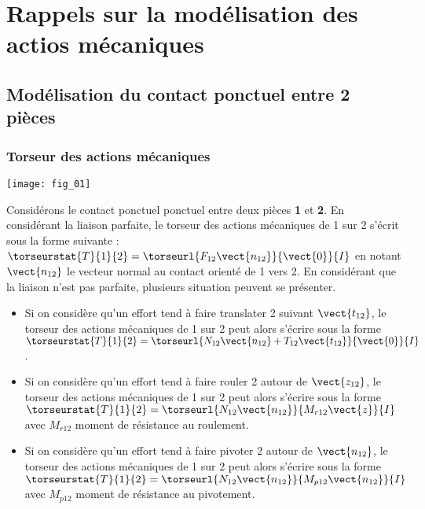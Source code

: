 \setchapterpreamble[u]{\margintoc}

\chapter{Rappels sur la modélisation des actios mécaniques}






\section{Modélisation du contact ponctuel entre 2 pièces}
\subsection{Torseur des actions mécaniques}
\begin{marginfigure}[3cm]
\begin{center}
\texttt{[image: fig\_01]}
\end{center}
\end{marginfigure}
Considérons le contact ponctuel ponctuel entre deux pièces \textbf{1} et \textbf{2}. En considérant la liaison parfaite, le torseur des actions mécaniques de 1 sur 2 s'écrit sous la forme suivante : $\torseurstat{T}{1}{2}=\torseurl{F_{12} \vect{n_{12}}}{\vect{0}}{I}$ en notant $\vect{n_{12}}$ le vecteur normal au contact orienté de 1 vers 2. 
En considérant que la liaison n'est pas parfaite, plusieurs situation peuvent se présenter.  


\begin{itemize}
\item Si on considère qu'un effort tend à faire translater 2 suivant $\vect{t_{12}}$, le torseur des actions mécaniques de 1 sur 2 peut alors s'écrire sous la forme $\torseurstat{T}{1}{2}=\torseurl{N_{12} \vect{n_{12}}+T_{12} \vect{t_{12}}}{\vect{0}}{I}$.
\item Si on considère qu'un effort tend à faire rouler 2 autour de $\vect{z_{12}}$, le torseur des actions mécaniques de 1 sur 2 peut alors s'écrire sous la forme $\torseurstat{T}{1}{2}=\torseurl{N_{12} \vect{n_{12}}}{M_{r12} \vect{z}}{I}$ avec $M_{r12}$ moment de résistance au roulement.
\item Si on considère qu'un effort tend à faire pivoter 2 autour de $\vect{n_{12}}$, le torseur des actions mécaniques de 1 sur 2 peut alors s'écrire sous la forme $\torseurstat{T}{1}{2}=\torseurl{N_{12} \vect{n_{12}}}{M_{p12} \vect{n_{12}}}{I}$ avec $M_{p12}$ moment de résistance au pivotement.
\end{itemize}

